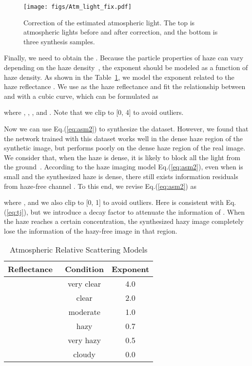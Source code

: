 \documentclass[journal]{IEEEtran}
\begin{document}
\begin{figure}[t]
    \centering
    \texttt{[image: figs/Atm\_light\_fix.pdf]}
    \caption{
        Correction of the estimated atmospheric light. 
        The top is atmospheric lights before and after correction, and the bottom is three synthesis samples.
    }
    \label{fig:cal}
\end{figure}


Finally, we need to obtain the .
Because the particle properties of haze can vary depending on the haze density~\cite{chavez1988improved}, the exponent  should be modeled as a function of haze density.
As shown in the Table~\ref{tab:rho_gamma}, we model the exponent  related to the haze reflectance . 
We use  as the haze reflectance and fit the relationship between  and  with a cubic curve, which can be formulated as

where , , , and . 
Note that we clip  to [0, 4] to avoid outliers.

Now we can use Eq.(\ref{eq:asm2}) to synthesize the dataset.
However, we found that the network trained with this dataset works well in the dense haze region of the synthetic image, but performs poorly on the dense haze region of the real image.
We consider that, when the haze is dense, it is likely to block all the light from the ground~\cite{huang2020single}. 
According to the haze imaging model Eq.(\ref{eq:asm2}), even when  is small and the synthesized haze is dense, there still exists information residuals from haze-free channel .
To this end, we revise Eq.(\ref{eq:asm2}) as

where , and we also clip  to [0, 1] to avoid outliers.
Here  is consistent with Eq.(\ref{eq:tj}), but we introduce a decay factor  to attenuate the information of .
When the haze reaches a certain concentration, the synthesized hazy image completely lose the information of the hazy-free image in that region. 

\begin{table}[!t]
    \centering
    \renewcommand\arraystretch{1.25}
    \begin{center}
    \caption{Atmospheric Relative Scattering Models}
    \label{tab:rho_gamma}
    \begin{tabular}{|ccc|}
    \hline
    Reflectance~ & Condition & Exponent  \\
    \hline
    \hline
     & very clear & 4.0 \\
     & clear & 2.0 \\
     & moderate & 1.0 \\
     & hazy & 0.7 \\
     & very hazy & 0.5 \\
     & cloudy & 0.0 \\
    \hline
    \end{tabular}
    \end{center}
\end{table}
\end{document}
